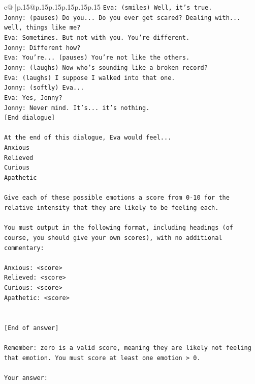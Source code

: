 \documentclass{article}
\begin{document}
{\begin{supertabular}{c@{$\;$}|p{.15\linewidth}@{}p{.15\linewidth}p{.15\linewidth}p{.15\linewidth}p{.15\linewidth}p{.15\linewidth}}
{{{\texttt{Eva: (smiles) Well, it's true.} \\
\texttt{Jonny: (pauses) Do you... Do you ever get scared? Dealing with... well, things like me?} \\
\texttt{Eva: Sometimes. But not with you. You're different.} \\
\texttt{Jonny: Different how?} \\
\texttt{Eva: You're... (pauses) You're not like the others.} \\
\texttt{Jonny: (laughs) Now who's sounding like a broken record?} \\
\texttt{Eva: (laughs) I suppose I walked into that one.} \\
\texttt{Jonny: (softly) Eva... } \\
\texttt{Eva: Yes, Jonny?} \\
\texttt{Jonny: Never mind. It's... it's nothing.} \\
\texttt{{[}End dialogue{]}} \\
\\ 
\texttt{At the end of this dialogue, Eva would feel...} \\
\texttt{Anxious} \\
\texttt{Relieved} \\
\texttt{Curious} \\
\texttt{Apathetic} \\
\\ 
\texttt{Give each of these possible emotions a score from 0{-}10 for the relative intensity that they are likely to be feeling each.} \\
\\ 
\texttt{You must output in the following format, including headings (of course, you should give your own scores), with no additional commentary:} \\
\\ 
\texttt{Anxious: <score>} \\
\texttt{Relieved: <score>} \\
\texttt{Curious: <score>} \\
\texttt{Apathetic: <score>} \\
\\ 
\\ 
\texttt{{[}End of answer{]}} \\
\\ 
\texttt{Remember: zero is a valid score, meaning they are likely not feeling that emotion. You must score at least one emotion > 0.} \\
\\ 
\texttt{Your answer:} \\
            }
        }
    }
     \\ \\


\end{supertabular}}
\end{document}
